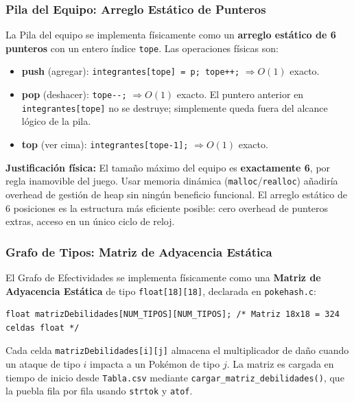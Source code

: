 \documentclass[12pt, letterpaper]{article}
\begin{document}
\subsubsection{Pila del Equipo: Arreglo Estático de Punteros}

La Pila del equipo se implementa físicamente como un \textbf{arreglo estático de 6 punteros} con un entero índice \texttt{tope}. Las operaciones físicas son:

\begin{itemize}
    \item \textbf{push} (agregar): \texttt{integrantes[tope] = p; tope++;} \quad $\Rightarrow O(1)$ exacto.
    \item \textbf{pop} (deshacer): \texttt{tope-{}-;} \quad $\Rightarrow O(1)$ exacto. El puntero anterior en \texttt{integrantes[tope]} no se destruye; simplemente queda fuera del alcance lógico de la pila.
    \item \textbf{top} (ver cima): \texttt{integrantes[tope-1];} \quad $\Rightarrow O(1)$ exacto.
\end{itemize}

\textbf{Justificación física:} El tamaño máximo del equipo es \textbf{exactamente 6}, por regla inamovible del juego. Usar memoria dinámica (\texttt{malloc}/\texttt{realloc}) añadiría overhead de gestión de heap sin ningún beneficio funcional. El arreglo estático de 6 posiciones es la estructura más eficiente posible: cero overhead de punteros extras, acceso en un único ciclo de reloj.

\subsubsection{Grafo de Tipos: Matriz de Adyacencia Estática}

El Grafo de Efectividades se implementa físicamente como una \textbf{Matriz de Adyacencia Estática} de tipo \texttt{float[18][18]}, declarada en \texttt{pokehash.c}:

\begin{lstlisting}[caption={Declaración de la Matriz de Adyacencia en \texttt{pokehash.c}}]
float matrizDebilidades[NUM_TIPOS][NUM_TIPOS]; /* Matriz 18x18 = 324 celdas float */
\end{lstlisting}

Cada celda \texttt{matrizDebilidades[i][j]} almacena el multiplicador de daño cuando un ataque de tipo $i$ impacta a un Pokémon de tipo $j$. La matriz es cargada en tiempo de inicio desde \texttt{Tabla.csv} mediante \texttt{cargar\_matriz\_debilidades()}, que la puebla fila por fila usando \texttt{strtok} y \texttt{atof}.
\end{document}
